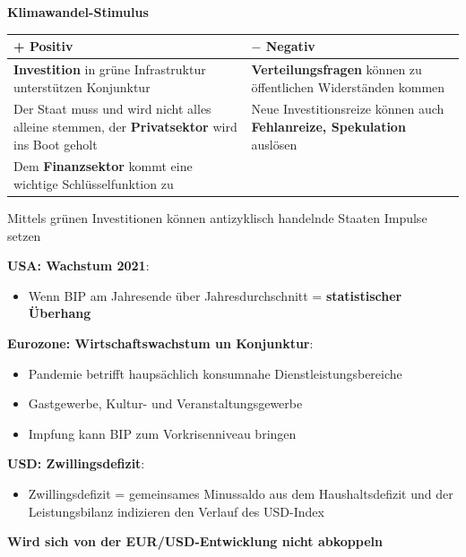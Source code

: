 \documentclass[9pt, landscape, fleqn]{scrartcl}
\begin{document}
\begin{multicols*}{3}
\textbf{Klimawandel-Stimulus} \newline \newline 
\begin{tabular}{|p{3.6cm}|p{3.6cm}|}
    \hline
    + Positiv & $-$ Negativ\\
    \hline
    \textbf{Investition} in grüne Infrastruktur unterstützen Konjunktur & \textbf{Verteilungsfragen} können zu öffentlichen Widerständen kommen \\
    \hline 
    Der Staat muss und wird nicht alles alleine stemmen, der \textbf{Privatsektor} wird ins Boot geholt & Neue Investitionsreize können auch \textbf{Fehlanreize, Spekulation} auslösen \\ 
    \hline 
    Dem \textbf{Finanzsektor} kommt eine wichtige Schlüsselfunktion zu & \\
    \hline 
\end{tabular}
\newline \newline Mittels grünen Investitionen können antizyklisch handelnde Staaten Impulse setzen \newline

\textbf{USA: Wachstum 2021}:

\begin{itemize}
    \item Wenn BIP am Jahresende über Jahresdurchschnitt = \textbf{statistischer Überhang}
\end{itemize}

\textbf{Eurozone: Wirtschaftswachstum un Konjunktur}:

\begin{itemize}
    \item Pandemie betrifft haupsächlich konsumnahe Dienstleistungsbereiche
    \item Gastgewerbe, Kultur- und Veranstaltungsgewerbe
    \item Impfung kann BIP zum Vorkrisenniveau bringen 
\end{itemize}

\textbf{USD: Zwillingsdefizit}:

\begin{itemize}
    \item Zwillingsdefizit = gemeinsames Minussaldo aus dem Haushaltsdefizit und der Leistungsbilanz indizieren den Verlauf des USD-Index 
\end{itemize} 

\textbf{Wird sich von der EUR/USD-Entwicklung nicht abkoppeln}


\end{multicols*}
\end{document}
